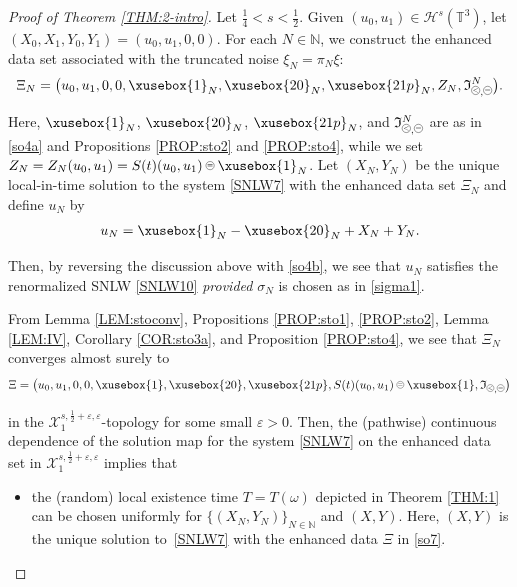 \documentclass[%
11pt,  reqno]{amsart}
\def\<#1>{\xusebox{#1}}
\newcommand{\pe}{\mathbin{\scaleobj{0.7}{\tikz \draw (0,0) node[shape=circle,draw,inner sep=0pt,minimum size=8.5pt] {\scriptsize  $=$};}}}
\newcommand{\pl}{\mathbin{\scaleobj{0.7}{\tikz \draw (0,0) node[shape=circle,draw,inner sep=0pt,minimum size=8.5pt] {\scriptsize $<$};}}}
\newcommand{\1}{\hspace{0.2mm}\text{I}\hspace{0.2mm}}
\newcommand{\noi}{\noindent}
\newcommand{\T}{\mathbb{T}}
\newcommand{\eps}{\varepsilon}
\newcommand{\s}{\sigma}
\renewcommand{\o}{\omega}
\newcommand{\N}{\mathbb{N}}
\renewcommand{\H}{\mathcal{H}}
\newcommand{\If}{\mathfrak{I}}
\numberwithin{equation}{section}
\numberwithin{theorem}{section}
\begin{document}
\begin{proof}[Proof of Theorem \ref{THM:2-intro}]


Let $\frac 14 <  s < \frac 12$.
Given  $(u_0, u_1) \in \H^{s}(\T^3)$, 
let $(X_0, X_1, Y_0, Y_1) = (u_0, u_1, 0, 0)$.
For each $N \in \N$, 
we construct the enhanced data set associated with the truncated noise $\xi_N = \pi_N \xi$:
\begin{align*}
\Xi_N
= \big(u_0, u_1, 0, 0, \<1>_N, \<20>_N,  \<21p>_N, 
Z_N, 
 \If_{\pl, \pe}^N\big).
\end{align*}

\noi
Here, 
 $\<1>_N$, $\<20>_N$,  $\<21p>_N$,
 and  
$ \If_{\pl, \pe}^N$
are as in \eqref{so4a} and Propositions \ref{PROP:sto2} and \ref{PROP:sto4}, 
while we set 
$Z_N = Z_N(u_0, u_1) = S(t)(u_0, u_1)\pe \<1>_N$.
Let $(X_N, Y_N)$ be the unique local-in-time
solution to the system \eqref{SNLW7}
with  the enhanced data set $\Xi_N$
and  define $u_N$ by
\begin{align}
 u_N =  \<1>_N - \<20>_N + X_N + Y_N.
\label{decomp4}
 \end{align}

\noi
Then, by reversing the discussion above with \eqref{so4b}, 
we see that $u_N$ satisfies the renormalized SNLW \eqref{SNLW10} \emph{provided}  $\s_N$ is chosen as in \eqref{sigma1}.



From 
Lemma \ref{LEM:stoconv},
Propositions \ref{PROP:sto1},  \ref{PROP:sto2}, 
Lemma \ref{LEM:IV}, 
Corollary \ref{COR:sto3a}, 
and
Proposition \ref{PROP:sto4}, 
we see that $\Xi_N$ converges 
almost surely to 
\begin{align}
\Xi =  \big(u_0, u_1, 0, 0, \<1>, \<20>,  \<21p>,  
S(t)(u_0, u_1)\pe \<1>, 
\If_{\pl, \pe}\big)
\label{so7}
\end{align}

\noi
in the $\mathcal{X}^{s, \frac 12 +\eps, \eps}_1$-topology
for some small $\eps > 0$.
Then, 
the (pathwise) continuous dependence
of the solution map for the system \eqref{SNLW7}
on the enhanced data set in $\mathcal{X}^{s, \frac 12 +\eps, \eps}_1$
implies 
that 

\medskip

\begin{itemize}
\item
the (random) local existence time  $T = T(\o)$ 
depicted in Theorem \ref{THM:1} can be chosen uniformly 
for $\big\{(X_N, Y_N) \big\}_{N \in \N}$ and $(X, Y)$.
Here,  $(X, Y)$ is the unique solution to~\eqref{SNLW7}
with the enhanced data $\Xi$ in \eqref{so7}.



\end{itemize}
\end{proof}
\end{document}
